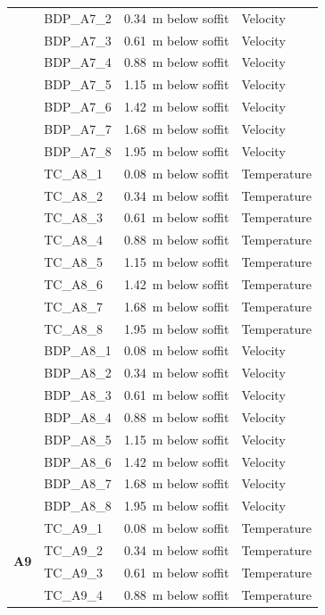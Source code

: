 \documentclass[12pt,oneside]{book}
\begin{document}
\begin{longtable}[c]{c|lll}
 & BDP\_A7\_2 & 0.34~m below soffit  & Velocity \\
 & BDP\_A7\_3 & 0.61~m below soffit  & Velocity \\
 & BDP\_A7\_4 & 0.88~m below soffit  & Velocity \\
 & BDP\_A7\_5 & 1.15~m below soffit  & Velocity \\
 & BDP\_A7\_6 & 1.42~m below soffit  & Velocity \\
 & BDP\_A7\_7 & 1.68~m below soffit  & Velocity \\
 & BDP\_A7\_8 & 1.95~m below soffit  & Velocity \\
\bottomrule
\newpage
\multirow{16}{*}{\large{\textbf{A8}}}
 & TC\_A8\_1  & 0.08~m below soffit  & Temperature \\
 & TC\_A8\_2  & 0.34~m below soffit  & Temperature \\
 & TC\_A8\_3  & 0.61~m below soffit  & Temperature \\
 & TC\_A8\_4  & 0.88~m below soffit  & Temperature \\
 & TC\_A8\_5  & 1.15~m below soffit  & Temperature \\
 & TC\_A8\_6  & 1.42~m below soffit  & Temperature \\
 & TC\_A8\_7  & 1.68~m below soffit  & Temperature \\
 & TC\_A8\_8  & 1.95~m below soffit  & Temperature \\
\cline{2-4}
 & BDP\_A8\_1 & 0.08~m below soffit  & Velocity \\
 & BDP\_A8\_2 & 0.34~m below soffit  & Velocity \\
 & BDP\_A8\_3 & 0.61~m below soffit  & Velocity \\
 & BDP\_A8\_4 & 0.88~m below soffit  & Velocity \\
 & BDP\_A8\_5 & 1.15~m below soffit  & Velocity \\
 & BDP\_A8\_6 & 1.42~m below soffit  & Velocity \\
 & BDP\_A8\_7 & 1.68~m below soffit  & Velocity \\
 & BDP\_A8\_8 & 1.95~m below soffit  & Velocity \\
\midrule
\multirow{16}{*}{\large{\textbf{A9}}}
 & TC\_A9\_1  & 0.08~m below soffit  & Temperature \\
 & TC\_A9\_2  & 0.34~m below soffit  & Temperature \\
 & TC\_A9\_3  & 0.61~m below soffit  & Temperature \\
 & TC\_A9\_4  & 0.88~m below soffit  & Temperature \\

\end{longtable}
\end{document}
